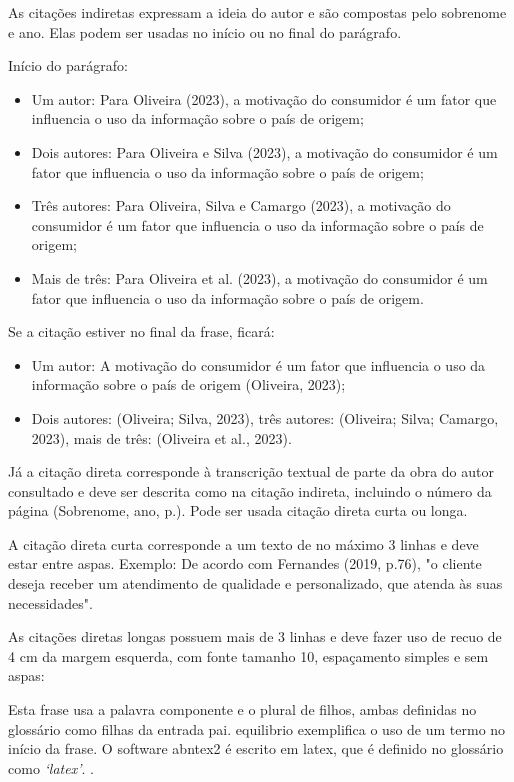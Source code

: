 \documentclass[
	article,
	12pt,
	oneside,
	a4paper,
	english,
	brazil,
	sumario=tradicional
]{abntex2}
\begin{document}
As citações indiretas expressam a ideia do autor e são compostas pelo sobrenome e ano. Elas podem ser usadas no início ou no final do parágrafo.

Início do parágrafo:

\begin{itemize}
    \item Um autor: Para Oliveira (2023), a motivação do consumidor é um fator que influencia o uso da informação sobre o país de origem;
    \item Dois autores: Para Oliveira e Silva (2023), a motivação do consumidor é um fator que influencia o uso da informação sobre o país de origem;
    \item Três autores: Para Oliveira, Silva e Camargo (2023), a motivação do consumidor é um fator que influencia o uso da informação sobre o país de origem;
    \item Mais de três: Para Oliveira et al. (2023), a motivação do consumidor é um fator que influencia o uso da informação sobre o país de origem.
\end{itemize}

Se a citação estiver no final da frase, ficará:

\begin{itemize}
    \item Um autor: A motivação do consumidor é um fator que influencia o uso da informação sobre o país de origem (Oliveira, 2023);
    \item Dois autores: (Oliveira; Silva, 2023), três autores: (Oliveira; Silva; Camargo, 2023), mais de três: (Oliveira et al., 2023).
\end{itemize}

Já a citação direta corresponde à transcrição textual de parte da obra do autor consultado e deve ser descrita como na citação indireta, incluindo o número da página (Sobrenome, ano, p.). Pode ser usada citação direta curta ou longa.

A citação direta curta corresponde a um texto de no máximo 3 linhas e deve estar entre aspas. Exemplo: De acordo com Fernandes (2019, p.76), "o cliente deseja receber um atendimento de qualidade e personalizado, que atenda às suas necessidades".

As citações diretas longas possuem mais de 3 linhas e deve fazer uso de recuo de 4 cm da margem esquerda, com fonte tamanho 10, espaçamento simples e sem aspas:

\begin{citacao}
Esta frase usa a palavra \gls{componente} e o plural de \glspl{filho}, ambas
definidas no glossário como filhas da entrada \gls{pai}. \Gls{equilibrio}
exemplifica o uso de um termo no início da frase. O software \gls{abntex2} é
escrito em \gls{latex}, que é definido no glossário como
\emph{`\glsdesc*{latex}'}. \cite{abntex2-wiki-como-customizar}.
\end{citacao}
\end{document}
